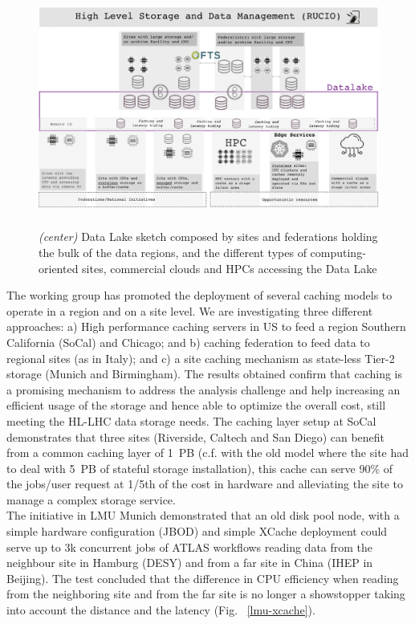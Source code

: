 \begin{figure}
  \centering
  \includegraphics[height=7.8cm]{datalake-sketch-square.png}
  \caption{{\em (center)} Data Lake sketch composed by sites and federations holding the bulk of the data regions, and the different types of computing-oriented sites, commercial clouds and HPCs accessing the Data Lake }
  \label{datalake-sketch}
\end{figure}
The working group has promoted the deployment of several caching models to operate in a region and on a site level. We are investigating three different approaches: a) High performance caching servers in US to feed a region Southern California (SoCal) and Chicago; and b) caching federation to feed data to regional sites (as in Italy); and c) a site caching mechanism as state-less Tier-2 storage (Munich and Birmingham). The results obtained confirm that caching is a promising mechanism to address the analysis challenge and help increasing an efficient usage of the storage and hence able to optimize the overall cost, still meeting the
HL-LHC data storage needs. The caching layer setup at SoCal demonstrates that three sites (Riverside, Caltech and San Diego) can benefit from a common caching layer of 1~PB (c.f. with the old model where the site had to deal with 5~PB of stateful storage installation), this cache can serve 90\% of the jobs/user request at 1/5th of the cost in hardware and alleviating the site to manage a complex storage service.\\
The initiative in LMU Munich demonstrated that an old disk pool node, with a simple hardware configuration (JBOD) and simple XCache deployment could serve up to 3k concurrent jobs of ATLAS workflows reading data from the neighbour site in Hamburg (DESY) and from a far site in China (IHEP in Beijing). The test concluded that the difference in CPU efficiency when reading from the neighboring site and from the far site is no longer a showstopper taking into account the distance and the latency (Fig. ~\ref{lmu-xcache}).\\

